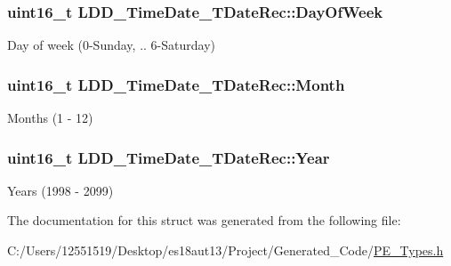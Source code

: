 \subsubsection[{Day\+Of\+Week}]{\setlength{\rightskip}{0pt plus 5cm}uint16\+\_\+t L\+D\+D\+\_\+\+Time\+Date\+\_\+\+T\+Date\+Rec\+::\+Day\+Of\+Week}\label{struct_l_d_d___time_date___t_date_rec_a11ed8bc2e3fbd80252a7d4802d316f1c}
Day of week (0-\/\+Sunday, .. 6-\/\+Saturday) \hypertarget{struct_l_d_d___time_date___t_date_rec_a28aaeffe98b07d60db379d12269fa822}{}
\subsubsection[{Month}]{\setlength{\rightskip}{0pt plus 5cm}uint16\+\_\+t L\+D\+D\+\_\+\+Time\+Date\+\_\+\+T\+Date\+Rec\+::\+Month}\label{struct_l_d_d___time_date___t_date_rec_a28aaeffe98b07d60db379d12269fa822}
Months (1 -\/ 12) \hypertarget{struct_l_d_d___time_date___t_date_rec_a58eee644efb4f46adc3437063c7bc194}{}
\subsubsection[{Year}]{\setlength{\rightskip}{0pt plus 5cm}uint16\+\_\+t L\+D\+D\+\_\+\+Time\+Date\+\_\+\+T\+Date\+Rec\+::\+Year}\label{struct_l_d_d___time_date___t_date_rec_a58eee644efb4f46adc3437063c7bc194}
Years (1998 -\/ 2099) 

The documentation for this struct was generated from the following file\+:\begin{DoxyCompactItemize}
\item 
C\+:/\+Users/12551519/\+Desktop/es18aut13/\+Project/\+Generated\+\_\+\+Code/\hyperlink{_p_e___types_8h}{P\+E\+\_\+\+Types.\+h}\end{DoxyCompactItemize}
